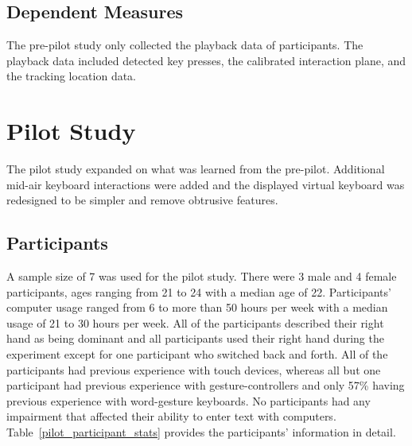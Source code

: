 \begin{table}[h]
	\centering
	\caption[Pre-pilot Study Schedule of Assessments]{\centering Schedule of Assessments for a single study visit (in minutes).}
	\label{pre_schedule_of_assessments}
\end{table}
	
\subsection{Dependent Measures}
The pre-pilot study only collected the playback data of participants. The playback data included detected key presses, the calibrated interaction plane, and the tracking location data.

\section{Pilot Study} \label{pilot}
The pilot study expanded on what was learned from the pre-pilot. Additional mid-air keyboard interactions were added and the displayed virtual keyboard was redesigned to be simpler and remove obtrusive features.

\subsection{Participants} \label{pilot_participants}
A sample size of 7 was used for the pilot study. There were 3 male and 4 female participants, ages ranging from 21 to 24 with a median age of 22. Participants' computer usage ranged from 6 to more than 50 hours per week with a median usage of 21 to 30 hours per week. All of the participants described their right hand as being dominant and all participants used their right hand during the experiment except for one participant who switched back and forth. All of the participants had previous experience with touch devices, whereas all but one participant had previous experience with gesture-controllers and only 57\% having previous experience with word-gesture keyboards. No participants had any impairment that affected their ability to enter text with computers. Table~\ref{pilot_participant_stats} provides the participants' information in detail.


